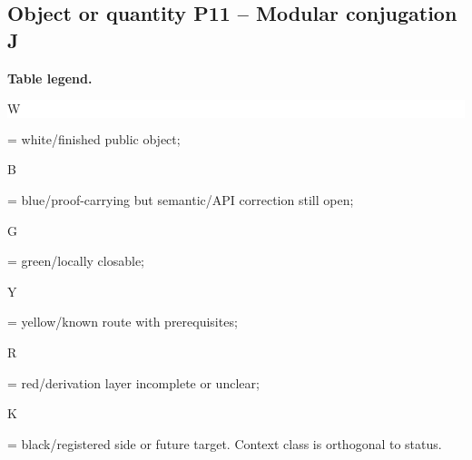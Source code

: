 \subsection*{Object or quantity P11 -- Modular conjugation J}
\hypertarget{objproof:P11}{}
\par\smallskip\noindent\begin{minipage}{0.99\linewidth}\footnotesize\raggedright\textbf{Table legend.} \colorbox{white}{\strut W} = white/finished public object; \colorbox{cyan!20}{\strut B} = blue/proof-carrying but semantic/API correction still open; \colorbox{green!18}{\strut G} = green/locally closable; \colorbox{yellow!25}{\strut Y} = yellow/known route with prerequisites; \colorbox{red!20}{\strut R} = red/derivation layer incomplete or unclear; \colorbox{black!18}{\strut K} = black/registered side or future target. Context class is orthogonal to status.\end{minipage}\par\vspace{0.25em}

